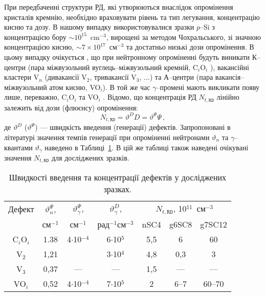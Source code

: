 При передбаченні структури РД, які утворюються внаслідок опромінення кристалів кремнію,
необхідно враховувати рівень та тип легування, концентрацію кисню та дозу.
В нашому випадку використовувалися зразки $p$--Si з концентрацією бору $\sim10^{15}$~cm$^{-3}$,
вирощені за методом Чохральського, зі значною концентрацією
кисню, $\sim7\times10^{17}$~см$^{-3}$ та достатньо низькі дози опромінення.
В цьому випадку очікується \cite{n:long,n:gamma,Moll:PhD}, що при нейтронному опроміненні будуть виникати
К--центри (пара міжвузольний вуглець--міжвузольний кремній, C$_i$O$_i$ ),
вакансійні кластери V$_n$ (дивакансії V$_2$, тривакансії V$_3$, ...) та
А--центри (пара вакансія--міжвузольний атом кисню, VO$_i$).
В той же час $\gamma$--промені мають викликати появу лише, переважно, C$_i$O$_i$ та VO$_i$ \cite{gamma:Stahl,Moll:PhD,gamma:Kolkr,A:Caracas}.
Відомо, що концентрація РД $N_{t,\mathtt{RD}}$ лінійно залежить від дози (флюєнсу) опромінення:
\begin{equation}
\label{eqNtRD}
    N_{t,\mathtt{RD}}=\vartheta^{D} D=\vartheta^{\Psi}\Psi \,,
\end{equation}
де $\vartheta^{D}$ ($\vartheta^{\Psi}$) --- швидкість введення (генерації) дефектів.
Запропоновані в літературі значення темпів генерації при опроміненні нейтронами $\vartheta_n$ та $\gamma$--квантами $\vartheta_\gamma$
наведено в Таблиці~\ref{tabDefectNt}.
В цій же таблиці також наведені очікувані значення $N_{t,\mathtt{RD}}$ для досліджених зразків.

\begin{table}
\caption{\label{tabDefectNt}Швидкості введення та концентрації дефектів у досліджених зразках.
}
\center
\begin{tabular}{|c|c|c|c|c|c|c|}
\hline
Дефект&$\vartheta_n^{\Psi}$,  &$\vartheta_\gamma^{\Psi}$,&$\vartheta_\gamma^D$,&\multicolumn{3}{c|}{$N_{t,\mathtt{RD}}$, 10$^{11}$~см$^{-3}$}\\
\cline{5-7}
&см$^{-1}$ \cite{Moll:PhD}&см$^{-1}$ \cite{gamma:Kolkr}&рад$^{-1}$см$^{-3}$ \cite{gamma:Stahl}&nSC4&g6SC8&g7SC12\\
\hline
C$_i$O$_i$&1.38&4$\cdot$10$^{-4}$&6$\cdot$10$^5$&5,5&6&60\\ \hline
V$_2$&1,21&&3$\cdot$10$^4$&4,8&0,3&3\\ \hline
V$_3$&0,37&---&---&1,5&---&---\\ \hline
VO$_i$&0,52&4$\cdot$10$^{-4}$&7$\cdot$10$^5$&2&6--7&60--70\\\hline
\end{tabular}
\end{table}

